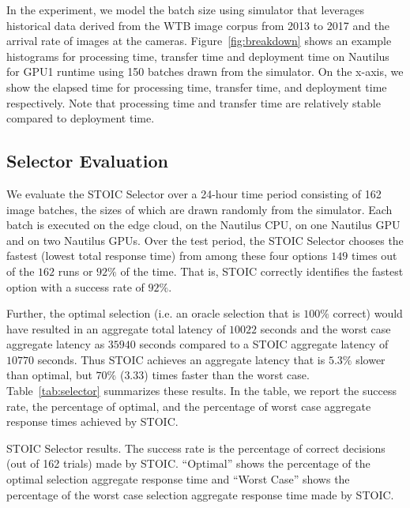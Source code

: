 In the experiment, we model the batch size using simulator that leverages
historical data derived from the WTB image corpus from 2013 to 2017 and the
arrival rate of images at the cameras. Figure~\ref{fig:breakdown} shows an
example histograms for processing time, transfer time and deployment time on
Nautilus for GPU1 runtime using 150 batches drawn from the simulator. On the
x-axis, we show the elapsed time for processing time, transfer time, and
deployment time respectively.  Note that processing time and transfer time are
relatively stable compared to deployment time. 

\subsection{Selector Evaluation}

We evaluate the STOIC Selector over a 24-hour time period consisting of 162
image batches, the sizes of which are drawn randomly from the simulator. Each
batch is executed on the edge cloud, on the Nautilus CPU, on one Nautilus GPU
and on two Nautilus GPUs. Over the test period, the STOIC Selector chooses the
fastest (lowest total response time) from among these four options $149$ times
out of the $162$ runs or $92\%$ of the time. That is, STOIC correctly
identifies the fastest option with a success rate of $92\%$.

Further, the optimal selection (i.e. an oracle selection that is $100\%$
correct) would have resulted in an aggregate total latency of $10022$ seconds
and the worst case aggregate latency as $35940$ seconds compared to a STOIC
aggregate latency of $10770$ seconds.  Thus STOIC achieves an aggregate
latency that is $5.3\%$ slower than optimal, but $70\%$ ($3.33$) times faster
than the worst case. Table~\ref{tab:selector} summarizes these results. In the
table, we report the success rate, the percentage of optimal, and the
percentage of worst case aggregate response times achieved by STOIC. 

\begin{table}[t] 
\begin{centering}
\captionsetup{justification=centering}

\end{centering}
\caption{
STOIC Selector results. The success rate is the percentage of correct decisions
(out of 162 trials) made by STOIC.  ``Optimal'' shows the percentage of the
optimal selection aggregate response time and ``Worst Case'' shows the percentage of the worst case 
selection aggregate response time made by STOIC.}
\label{tab:selector}
\end{table}

